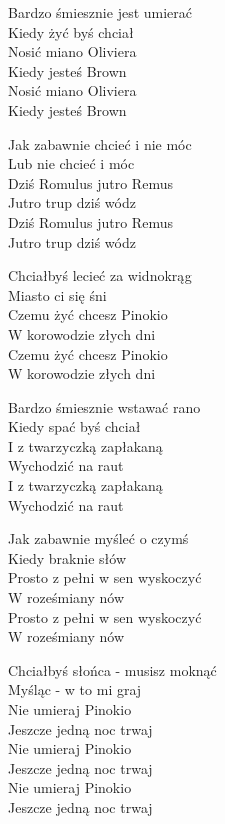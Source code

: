 \begin{text}
    Bardzo śmiesznie jest umierać\\
    Kiedy żyć byś chciał\\
    Nosić miano Oliviera\\
    Kiedy jesteś Brown\\
    Nosić miano Oliviera\\
    Kiedy jesteś Brown

    Jak zabawnie chcieć i nie móc\\
    Lub nie chcieć i móc\\
    Dziś Romulus jutro Remus\\
    Jutro trup dziś wódz\\
    Dziś Romulus jutro Remus\\
    Jutro trup dziś wódz

    Chciałbyś lecieć za widnokrąg\\
    Miasto ci się śni\\
    Czemu żyć chcesz Pinokio\\
    W korowodzie złych dni\\
    Czemu żyć chcesz Pinokio\\
    W korowodzie złych dni

    Bardzo śmiesznie wstawać rano\\
    Kiedy spać byś chciał\\
    I z twarzyczką zapłakaną\\
    Wychodzić na raut\\
    I z twarzyczką zapłakaną\\
    Wychodzić na raut

    Jak zabawnie myśleć o czymś\\
    Kiedy braknie słów\\
    Prosto z pełni w sen wyskoczyć\\
    W roześmiany nów\\
    Prosto z pełni w sen wyskoczyć\\
    W roześmiany nów

    Chciałbyś słońca - musisz moknąć\\
    Myśląc - w to mi graj\\
    Nie umieraj Pinokio\\
    Jeszcze jedną noc trwaj\\
    Nie umieraj Pinokio\\
    Jeszcze jedną noc trwaj\\
    Nie umieraj Pinokio\\
    Jeszcze jedną noc trwaj
\end{text}
